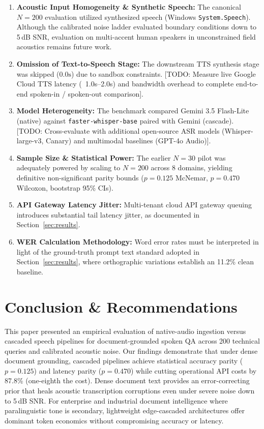 \documentclass[10pt,a4paper,twocolumn]{article}
\begin{document}
\begin{enumerate}
    \item \textbf{Acoustic Input Homogeneity \& Synthetic Speech:} The canonical $N = 200$ evaluation utilized synthesized speech (Windows \texttt{System.Speech}). Although the calibrated noise ladder evaluated boundary conditions down to 5\,dB SNR, evaluation on multi-accent human speakers in unconstrained field acoustics remains future work.
    \item \textbf{Omission of Text-to-Speech Stage:} The downstream TTS synthesis stage was skipped ($0.0\text{s}$) due to sandbox constraints. [TODO: Measure live Google Cloud TTS latency (~1.0s--2.0s) and bandwidth overhead to complete end-to-end spoken-in / spoken-out comparison].
    \item \textbf{Model Heterogeneity:} The benchmark compared Gemini 3.5 Flash-Lite (native) against \texttt{faster-whisper-base} paired with Gemini (cascade). [TODO: Cross-evaluate with additional open-source ASR models (Whisper-large-v3, Canary) and multimodal baselines (GPT-4o Audio)].
    \item \textbf{Sample Size \& Statistical Power:} The earlier $N = 30$ pilot was adequately powered by scaling to $N = 200$ across 8 domains, yielding definitive non-significant parity bounds ($p = 0.125$ McNemar, $p = 0.470$ Wilcoxon, bootstrap 95\% CIs).
    \item \textbf{API Gateway Latency Jitter:} Multi-tenant cloud API gateway queuing introduces substantial tail latency jitter, as documented in Section~\ref{sec:results}.
    \item \textbf{WER Calculation Methodology:} Word error rates must be interpreted in light of the ground-truth prompt text standard adopted in Section~\ref{sec:results}, where orthographic variations establish an 11.2\% clean baseline.
\end{enumerate}

\section{Conclusion \& Recommendations}
\label{sec:conclusion}

This paper presented an empirical evaluation of native-audio ingestion versus cascaded speech pipelines for document-grounded spoken QA across 200 technical queries and calibrated acoustic noise. Our findings demonstrate that under dense document grounding, cascaded pipelines achieve statistical accuracy parity ($p = 0.125$) and latency parity ($p = 0.470$) while cutting operational API costs by 87.8\% (one-eighth the cost). Dense document text provides an error-correcting prior that heals acoustic transcription corruptions even under severe noise down to 5\,dB SNR. For enterprise and industrial document intelligence where paralinguistic tone is secondary, lightweight edge-cascaded architectures offer dominant token economics without compromising accuracy or latency.



\end{document}

